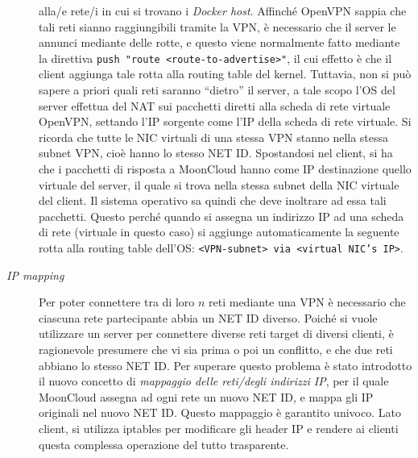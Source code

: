 \begin{description}
  alla/e rete/i in cui si trovano i \textit{Docker host}. Affinché OpenVPN sappia che
  tali reti sianno raggiungibili tramite la VPN, è necessario che il server
  le annunci mediante delle rotte, e questo viene normalmente fatto mediante la direttiva
  \texttt{push "route <route-to-advertise>"}, il cui effetto è che il client aggiunga
  tale rotta alla routing table del kernel. Tuttavia, non si può sapere a priori
  quali reti saranno ``dietro'' il server, a tale scopo l'OS del server
  effettua del NAT sui pacchetti diretti alla scheda di rete virtuale OpenVPN,
  settando l'IP sorgente come l'IP della scheda di rete virtuale. Si ricorda che
  tutte le NIC virtuali di una stessa VPN stanno nella stessa subnet VPN, cioè hanno
  lo stesso NET ID.
  Spostandosi
  nel client, si ha che i pacchetti di risposta a MoonCloud hanno come IP destinazione
  quello virtuale del server, il quale si trova nella stessa subnet della NIC
  virtuale del client. Il sistema operativo sa quindi che deve inoltrare ad essa
  tali pacchetti. 
  Questo perché quando si assegna un indirizzo IP ad una scheda di rete (virtuale in
  questo caso) si
  aggiunge automaticamente la seguente rotta alla routing table dell'OS:
  \texttt{<VPN-subnet> via <virtual NIC's IP>}.
  \item[\textit{IP mapping}]Per poter connettere tra di loro $n$ reti mediante
  una VPN è necessario che ciascuna rete partecipante abbia un NET ID diverso. Poiché
  si vuole utilizzare un server per connettere diverse reti target di diversi clienti,
  è ragionevole presumere che vi sia prima o poi un conflitto, e che due reti abbiano
  lo stesso NET ID. Per superare questo problema è stato introdotto il nuovo concetto
  di \textit{mappaggio delle reti/degli indirizzi IP}, per il quale MoonCloud assegna
  ad ogni rete un nuovo NET ID, e mappa gli IP originali nel nuovo NET ID. Questo
  mappaggio è garantito univoco. Lato client, si utilizza iptables per
  modificare gli header IP e rendere ai clienti questa complessa operazione del tutto
  trasparente.
\end{description}
